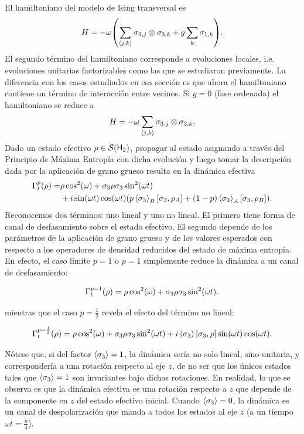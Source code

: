 El hamiltoniano del modelo de Ising transversal es
\begin{equation}
    H=-\omega\qty(\sum_{\langle j,k \rangle}\sigma_{3,j}\otimes\sigma_{3,k}+g\sum_{k}\sigma_{1,k}).\nonumber
\end{equation}
El segundo término del hamiltoniano corresponde a evoluciones locales, i.e. evoluciones unitarias factorizables como las que se estudiaron previamente. La diferencia con los casos estudiados en esa sección es que ahora el hamiltoniano contiene un término de interacción entre vecinos. Si $g=0$ (fase ordenada) el hamiltoniano se reduce a
\begin{equation}
    H=-\omega\sum_{\langle j,k \rangle}\sigma_{3,j}\otimes\sigma_{3,k}.\nonumber
\end{equation}
Dado un estado efectivo $\rho\in\mathcal{S}({\sf H}_{2})$, propagar al estado asignando a través del Principio de Máxima Entropía con dicha evolución y luego tomar la descripción dada por la aplicación de grano grueso resulta en la dinámica efectiva
\begin{align*}
    \Gamma_{t}^{p}(\rho)=&\rho \cos^{2}(\omega)+\sigma_{3} \rho \sigma_{3} \sin^{2}(\omega t)\\
    & + i\sin(\omega t)\cos(\omega t)\qty(p\expval{\sigma_{3}}_{B}[\sigma_{3},\rho_{A}]+(1-p)\expval{\sigma_{3}}_{A}[\sigma_{3},\rho_{B}]).
\end{align*}
Reconocemos dos términos: uno lineal y uno no lineal. El primero tiene forma de canal de desfasamiento sobre el estado efectivo. El segundo depende de los parámetros de la aplicación de grano grueso y de los valores esperados con respecto a los operadores de densidad reducidos del estado de máxima entropía. En efecto, el caso límite $p=1$ o $p=1$ simplemente reduce la dinámica a un canal de desfasamiento:

\begin{equation*}
    \Gamma_{t}^{p=1}(\rho)=\rho \cos^{2}(\omega)+\sigma_{3} \rho \sigma_{3} \sin^{2}(\omega t).
\end{equation*}

mientras que el caso $p=\frac{1}{2}$ revela el efecto del término no lineal:

\begin{equation*}
    \Gamma_{t}^{p=\frac{1}{2}}(\rho)=\rho \cos^{2}(\omega)+\sigma_{3} \rho \sigma_{3} \sin^{2}(\omega t) + i\expval{\sigma_{3}} \qty[\sigma_{3},\rho] \sin(\omega t)\cos(\omega t).
\end{equation*}

Nótese que, si del factor $\expval{\sigma_{3}}=1$, la dinámica sería no solo lineal, sino unitaria, y correspondería a una rotación respecto al eje $z$, de no ser que los únicos estados tales que $\expval{\sigma_{3}}=1$ son invariantes bajo dichas rotaciones. En realidad, lo que se observa es que la dinámica efectiva es una rotación respecto a $z$ que depende de la componente en $z$ del estado efectivo inicial. Cuando $\expval{\sigma_{3}}=0$, la dinámica es un canal de despolarización que manda a todos los estados al eje $z$ (a un tiempo $\omega t =\frac{\pi}{4}$). 

